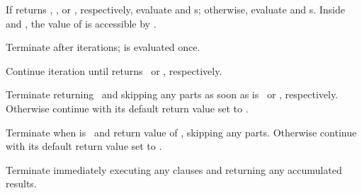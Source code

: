 \begin{LIST}{1cm}
\begin{LIST}{.5cm}
    {
    If  returns \T, \T, or \NIL, respectively, evaluate
     and s; otherwise, evaluate 
    and s. Inside  and , the value
    of  is accessible by . 
    }

    {
    Terminate  after  iterations;  is evaluated once.
    }

    {
    Continue iteration until  returns \NIL\ or \T, respectively.
    }

    {
    Terminate  returning \NIL\ and skipping any
     parts as soon as  is \NIL\ or \T,
    respectively. Otherwise continue  with its default return
    value set to \T. 
    }

    {
    Terminate  when  is \T\ and return value of
    , skipping any  parts. Otherwise continue
     with its default return value set to \NIL. 
    }

    {
    Terminate  immediately executing any 
    clauses and returning any accumulated results.
    }
  \end{LIST}
\end{LIST}





